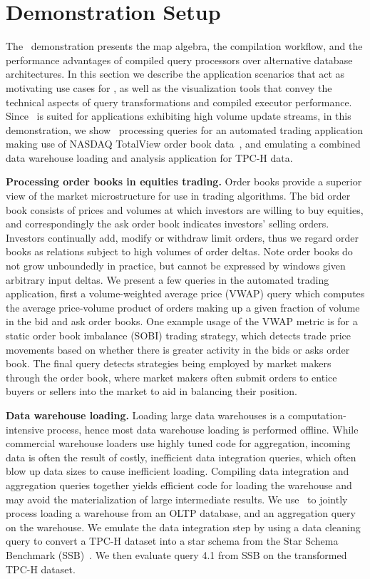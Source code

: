 
\section{Demonstration Setup}
The \compiler\ demonstration presents the map algebra, the compilation workflow,
and the performance advantages of compiled query processors over alternative
database architectures. In this section we describe the application scenarios
that act as motivating use cases for \compiler, as well as the visualization
tools that convey the technical aspects of query transformations and compiled
executor performance.
Since \compiler\ is suited for applications exhibiting high volume update
streams, in this demonstration, we show \compiler\ processing queries for an
automated trading application making use of NASDAQ TotalView order book
data~\cite{totalview-url}, and emulating a combined data warehouse loading and
analysis application for TPC-H data. 

\smallskip
\noindent\textbf{Processing order books in equities trading.}
Order books provide a superior view of the market microstructure for use in
trading algorithms. The bid order book consists of prices and volumes at which
investors are willing to buy equities, and correspondingly the ask order book
indicates investors' selling orders.
Investors continually add, modify or withdraw limit orders, thus we regard order
books as relations subject to high volumes of order deltas. Note order books do
not grow unboundedly in practice, but cannot be expressed by windows given
arbitrary input deltas. We present a few queries in the automated trading
application, first a volume-weighted average price (VWAP) query which computes
the average price-volume product of orders making up a given fraction of volume
in the bid and ask order books. One example usage of the VWAP metric is for a
static order book imbalance (SOBI) trading strategy, which detects trade price
movements based on whether there is greater activity in the bids or asks order
book. The final query detects strategies being employed by market makers through
the order book, where market makers often submit orders to entice buyers or
sellers into the market to aid in balancing their position.

\smallskip
\noindent\textbf{Data warehouse loading.}
Loading large data warehouses is a computation-intensive process, hence most
data warehouse loading is performed offline. While commercial warehouse loaders use
highly tuned code for aggregation, incoming data is often the result of costly,
inefficient data integration queries, which often blow up data sizes to cause
inefficient loading. Compiling data integration and aggregation queries together
yields efficient code for loading the warehouse and may avoid the
materialization of large intermediate results.
We use \compiler\ to jointly process loading a warehouse from an OLTP database,
and an aggregation query on the warehouse. We emulate the data integration step
by using a data cleaning query to convert a TPC-H dataset into a star schema from
the Star Schema Benchmark (SSB)~\cite{poneil-ssb:07}. We then evaluate query 4.1
from SSB on the transformed TPC-H dataset.

